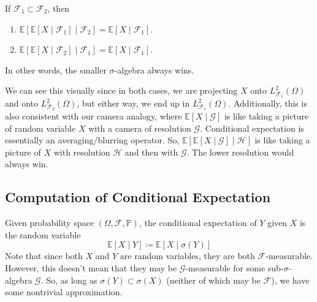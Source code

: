 \documentclass{article}
\begin{document}
    \begin{theorem}
      If $\mathcal{F}_1 \subset \mathcal{F}_2$, then 
      \begin{enumerate}
        \item $\mathbb{E}[ \mathbb{E}[X \mid \mathcal{F}_1] \mid \mathcal{F}_2] = \mathbb{E}[X \mid \mathcal{F}_1]$. 
        \item $\mathbb{E}[ \mathbb{E}[X \mid \mathcal{F}_2] \mid \mathcal{F}_1] = \mathbb{E}[X \mid \mathcal{F}_1]$. 
      \end{enumerate}
      In other words, the smaller $\sigma$-algebra always wins. 
    \end{theorem}

    We can see this visually since in both cases, we are projecting $X$ onto $L^2_{\mathcal{F}_1} (\Omega)$ and onto $L^2_{\mathcal{F}_2} (\Omega)$, but either way, we end up in $L^2_{\mathcal{F}_1} (\Omega)$. Additionally, this is also consistent with our camera analogy, where $\mathbb{E}[X \mid \mathcal{G}]$ is like taking a picture of random variable $X$ with a camera of resolution $\mathcal{G}$. Conditional expectation is essentially an averaging/blurring operator. So, $\mathbb{E}[\mathbb{E}[X \mid \mathcal{G}] \mid \mathcal{H}]$ is like taking a picture of $X$ with resolution $\mathcal{H}$ and then with $\mathcal{G}$. The lower resolution would always win. 

  \subsection{Computation of Conditional Expectation}

    \begin{definition}
      Given probability space $(\Omega, \mathcal{F}, \mathbb{P})$, the conditional expectation of $Y$ given $X$ is the random variable 
      \begin{equation}
        \mathbb{E}[X \mid Y] \coloneqq \mathbb{E}[X \mid \sigma(Y)]
      \end{equation}
      Note that since both $X$ and $Y$ are random variables, they are both $\mathcal{F}$-measurable. However, this doesn't mean that they may be $\mathcal{G}$-measurable for some sub-$\sigma$-algebra $\mathcal{G}$. So, as long as $\sigma(Y) \subset \sigma(X)$ (neither of which may be $\mathcal{F}$), we have some nontrivial approximation. 
    \end{definition}
\end{document}
